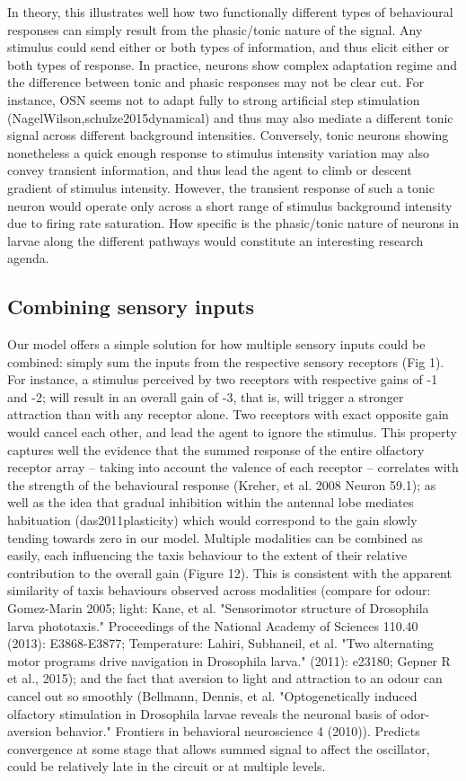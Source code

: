 \documentclass[10pt,a4paper]{article}
\begin{document}
In theory, this illustrates well how two functionally different types of behavioural responses can simply result from the phasic/tonic nature of the signal. Any stimulus could send either or both types of information, and thus elicit either or both types of response. In practice, neurons show complex adaptation regime and the difference between tonic and phasic responses may not be clear cut. For instance, OSN seems not to adapt fully to strong artificial step stimulation (NagelWilson,schulze2015dynamical) and thus may also mediate a different tonic signal across different background intensities. Conversely, tonic neurons showing nonetheless a quick enough response to stimulus intensity variation may also convey transient information, and thus lead the agent to climb or descent gradient of stimulus intensity. However, the transient response of such a tonic neuron would operate only across a short range of stimulus background intensity due to firing rate saturation. How specific is the phasic/tonic nature of neurons in larvae along the different pathways would constitute an interesting research agenda.

\subsection{Combining sensory inputs}
Our model offers a simple solution for how multiple sensory inputs could be combined: simply sum the inputs from the respective sensory receptors (Fig 1). For instance, a stimulus perceived by two receptors with respective gains of -1 and -2; will result in an overall gain of -3, that is, will trigger a stronger attraction than with any receptor alone. Two receptors with exact opposite gain would cancel each other, and lead the agent to ignore the stimulus. This property captures well the evidence that the summed response of the entire olfactory receptor array – taking into account the valence of each receptor – correlates with the strength of the behavioural response (Kreher, et al. 2008 Neuron 59.1); as well as the idea that gradual inhibition within the antennal lobe mediates habituation (das2011plasticity) which would correspond to the gain slowly tending towards zero in our model. 
Multiple modalities can be combined as easily, each influencing the taxis behaviour to the extent of their relative contribution to the overall gain (Figure 12). This is consistent with the apparent similarity of taxis behaviours observed across modalities (compare for odour: Gomez-Marin 2005; light: Kane, et al. "Sensorimotor structure of Drosophila larva phototaxis." Proceedings of the National Academy of Sciences 110.40 (2013): E3868-E3877;  Temperature: Lahiri, Subhaneil, et al. "Two alternating motor programs drive navigation in Drosophila larva." (2011): e23180; Gepner R et al., 2015); and the fact that aversion to light and attraction to an odour can cancel out so smoothly (Bellmann, Dennis, et al. "Optogenetically induced olfactory stimulation in Drosophila larvae reveals the neuronal basis of odor-aversion behavior." Frontiers in behavioral neuroscience 4 (2010)). Predicts convergence at some stage that allows summed signal to affect the oscillator, could be relatively late in the circuit or at multiple levels.
\end{document}
